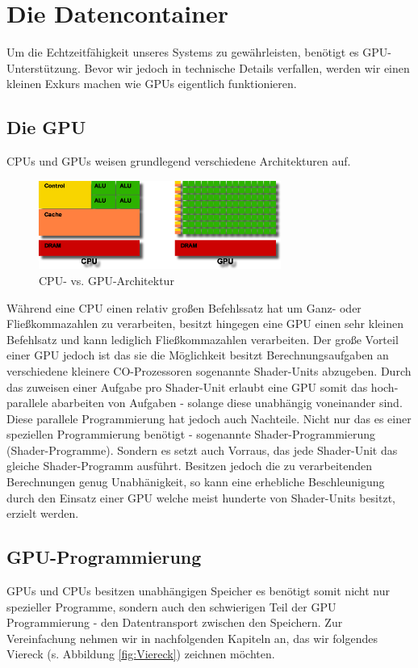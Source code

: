 \section{Die Datencontainer}
\begin{Spacing}{\mylinespace}
Um die Echtzeitfähigkeit unseres Systems zu gewährleisten, benötigt es GPU-Unterstützung.
Bevor wir jedoch in technische Details verfallen, werden wir einen kleinen Exkurs machen wie GPUs eigentlich funktionieren.
\subsection{Die GPU}
CPUs und GPUs weisen grundlegend verschiedene Architekturen auf.
\begin{figure}[h!]
	\vspace*{20px}
	\centering
	\includegraphics[width=300px]{graphics/GPUvsCPU.png}	
	\caption{CPU- vs. GPU-Architektur}
	\label{fig:GPUvsCPU}
\end{figure}

Während eine CPU einen relativ großen Befehlssatz hat um Ganz- oder Fließkommazahlen zu verarbeiten, besitzt hingegen eine GPU einen sehr kleinen Befehlsatz und kann lediglich Fließkommazahlen verarbeiten.
Der große Vorteil einer GPU jedoch ist das sie die Möglichkeit besitzt Berechnungsaufgaben an verschiedene kleinere CO-Prozessoren sogenannte Shader-Units abzugeben.
Durch das zuweisen einer Aufgabe pro Shader-Unit erlaubt eine GPU somit das hoch-parallele abarbeiten von Aufgaben - solange diese unabhängig voneinander sind.
Diese parallele Programmierung hat jedoch auch Nachteile.
Nicht nur das es einer speziellen Programmierung benötigt - sogenannte Shader-Programmierung (Shader-Programme).
Sondern es setzt auch Vorraus, das jede Shader-Unit das gleiche Shader-Programm ausführt.
Besitzen jedoch die zu verarbeitenden Berechnungen genug Unabhänigkeit, so kann eine erhebliche Beschleunigung durch den Einsatz einer GPU welche meist hunderte von Shader-Units besitzt, erzielt werden.


\subsection{GPU-Programmierung}
GPUs und CPUs besitzen unabhängigen Speicher es benötigt somit nicht nur spezieller Programme, sondern auch den schwierigen Teil der GPU Programmierung - den Datentransport zwischen den Speichern.
Zur Vereinfachung nehmen wir in nachfolgenden Kapiteln an, das wir folgendes Viereck (s. Abbildung \ref{fig:Viereck}) zeichnen möchten.


\end{Spacing}
